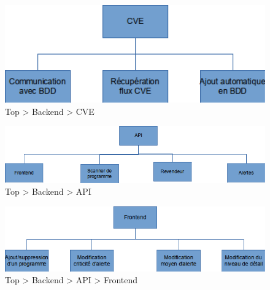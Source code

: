 \begin{figure}[H]
  \vspace*{2cm}
  \caption{Top \textgreater{} Backend \textgreater{} CVE}
  \centering
  \vspace*{0.5cm}
  \includegraphics[max width=18cm]{wbs3_backend_cve.png}
\end{figure}

\begin{figure}[H]
  \vspace*{2cm}
  \caption{Top \textgreater{} Backend \textgreater{} API}
  \centering
  \vspace*{0.5cm}
  \includegraphics[max width=18cm]{wbs3_backend_api_top.png}
\end{figure}

\begin{figure}[H]
  \vspace*{2cm}
  \caption{Top \textgreater{} Backend \textgreater{} API \textgreater{} Frontend}
  \centering
  \vspace*{0.5cm}
  \includegraphics[max width=18cm]{wbs3_backend_api_frontend.png}
\end{figure}

